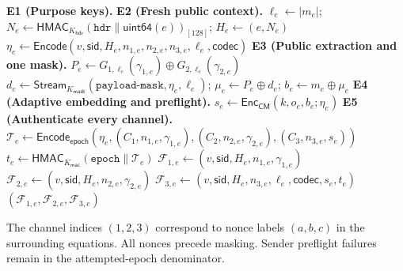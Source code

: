 \documentclass[pdflatex,sn-mathphys-num]{sn-jnl}%
\theoremstyle{definition}
\theoremstyle{game}
\theoremstyle{thmstyleone}%
\theoremstyle{thmstyletwo}%
\theoremstyle{thmstylethree}%
\begin{document}
\begin{algorithm}[H]
\footnotesize
\caption{Message Encoding and Complete-Epoch Authentication}
\label{alg:MessageEncoding}
\textbf{E1 (Purpose keys).}
\textbf{E2 (Fresh public context).}
$\ell_e\leftarrow|m_e|$;
$N_e\leftarrow\mathsf{HMAC}_{K_{\mathsf{hdr}}}(\texttt{hdr}\parallel\mathsf{uint64}(e))_{[128]}$;
$H_e\leftarrow(e,N_e)$\;
$\eta_e\leftarrow\mathsf{Encode}(v,\mathsf{sid},H_e,n_{1,e},n_{2,e},n_{3,e},\ell_e,\mathsf{codec})$\;
\textbf{E3 (Public extraction and one mask).}
$P_e\leftarrow G_{1,\ell_e}(\gamma_{1,e})\oplus G_{2,\ell_e}(\gamma_{2,e})$\;
$d_e\leftarrow\mathsf{Stream}_{K_{\mathsf{mask}}}(\texttt{payload-mask},\eta_e,\ell_e)$;
$\mu_e\leftarrow P_e\oplus d_e$;
$b_e\leftarrow m_e\oplus\mu_e$\;
\textbf{E4 (Adaptive embedding and preflight).}
$s_e\leftarrow\mathsf{Enc}_{\mathsf{CM}}(k,o_e,b_e;\eta_e)$\;
\textbf{E5 (Authenticate every channel).}
$\mathcal T_e\leftarrow\mathsf{Encode}_{\mathsf{epoch}}
(\eta_e,(C_1,n_{1,e},\gamma_{1,e}),(C_2,n_{2,e},\gamma_{2,e}),(C_3,n_{3,e},s_e))$\;
$t_e\leftarrow\mathsf{HMAC}_{K_{\mathsf{mac}}}(\texttt{epoch}\parallel\mathcal T_e)$\;
$\mathcal F_{1,e}\leftarrow(v,\mathsf{sid},H_e,n_{1,e},\gamma_{1,e})$\;
$\mathcal F_{2,e}\leftarrow(v,\mathsf{sid},H_e,n_{2,e},\gamma_{2,e})$\;
$\mathcal F_{3,e}\leftarrow(v,\mathsf{sid},H_e,n_{3,e},\ell_e,\mathsf{codec},s_e,t_e)$\;
\Return $(\mathcal F_{1,e},\mathcal F_{2,e},\mathcal F_{3,e})$\;
\end{algorithm}
The channel indices $(1,2,3)$ correspond to nonce labels $(a,b,c)$ in the
surrounding equations. All nonces precede masking. Sender preflight failures
remain in the attempted-epoch denominator.
\end{document}
